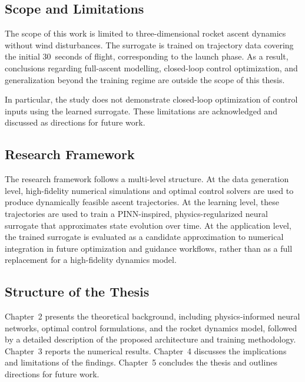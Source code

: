 \subsection{Scope and Limitations}

The scope of this work is limited to three-dimensional rocket ascent dynamics
without wind disturbances. The surrogate is trained on trajectory data covering
the initial 30~seconds of flight, corresponding to the launch phase. As a
result, conclusions regarding full-ascent modelling, closed-loop control
optimization, and generalization beyond the training regime are outside the
scope of this thesis.

In particular, the study does not demonstrate closed-loop optimization of
control inputs using the learned surrogate. These limitations are acknowledged
and discussed as directions for future work.

\subsection{Research Framework}

The research framework follows a multi-level structure. At the data generation
level, high-fidelity numerical simulations and optimal control solvers are used
to produce dynamically feasible ascent trajectories. At the learning level,
these trajectories are used to train a PINN-inspired, physics-regularized
neural surrogate that approximates state evolution over time. At the application
level, the trained surrogate is evaluated as a candidate approximation to
numerical integration in future optimization and guidance workflows, rather than
as a full replacement for a high-fidelity dynamics model.

\subsection{Structure of the Thesis}

Chapter~2 presents the theoretical background, including physics-informed neural 
networks, optimal control formulations, and the rocket dynamics model, followed 
by a detailed description of the proposed architecture and training methodology. 
Chapter~3 reports the numerical results. Chapter~4 discusses the implications and 
limitations of the findings. Chapter~5 concludes the thesis and outlines directions 
for future work.
